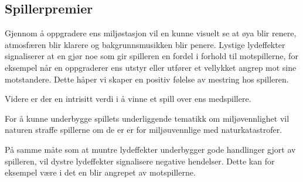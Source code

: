 
\subsection{Spillerpremier}

Gjennom å oppgradere ens miljøstasjon vil en kunne visuelt se at øya blir renere, atmosfæren blir klarere og bakgrunnsmusikken blir penere. Lystige lydeffekter signaliserer at en gjør noe som gir spilleren en fordel i forhold til motspillerne, for eksempel når en oppgraderer ens utstyr eller utfører et vellykket angrep mot sine motstandere. Dette håper vi skaper en positiv følelse av mestring hos spilleren. 

Videre er der en intrisitt verdi i å vinne et spill over ens medspillere.

For å kunne underbygge spillets underliggende tematikk om miljøvennlighet vil naturen straffe spillerne om de er er for miljøuvennlige med naturkatastrofer.

På samme måte som at muntre lydeffekter underbygger gode handlinger gjort av spilleren, vil dystre lydeffekter signalisere negative hendelser. Dette kan for eksempel være i det en blir angrepet av motspillerne. 